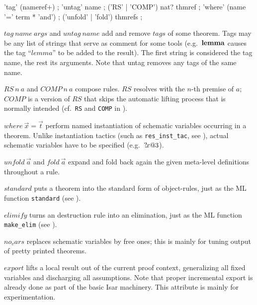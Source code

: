 \begin{rail}
  'tag' (nameref+)
  ;
  'untag' name
  ;
  ('RS' | 'COMP') nat? thmref
  ;
  'where' (name '=' term * 'and')
  ;
  ('unfold' | 'fold') thmrefs
  ;
\end{rail}

\begin{descr}
\item [$tag~name~args$ and $untag~name$] add and remove $tags$ of some
  theorem.  Tags may be any list of strings that serve as comment for some
  tools (e.g.\ ${\mathord{\mathbf{lemma}}}$ causes the tag ``$lemma$'' to be added to the
  result).  The first string is considered the tag name, the rest its
  arguments.  Note that untag removes any tags of the same name.
\item [$RS~n~a$ and $COMP~n~a$] compose rules.  $RS$ resolves with the $n$-th
  premise of $a$; $COMP$ is a version of $RS$ that skips the automatic lifting
  process that is normally intended (cf.\ \texttt{RS} and \texttt{COMP} in
  \cite[\S5]{isabelle-ref}).
\item [$where~\vec x = \vec t$] perform named instantiation of schematic
  variables occurring in a theorem.  Unlike instantiation tactics (such as
  \texttt{res_inst_tac}, see \cite{isabelle-ref}), actual schematic variables
  have to be specified (e.g.\ ${?\!x@3}$).
  
\item [$unfold~\vec a$ and $fold~\vec a$] expand and fold back again the given
  meta-level definitions throughout a rule.
 
\item [$standard$] puts a theorem into the standard form of object-rules, just
  as the ML function \texttt{standard} (see \cite[\S5]{isabelle-ref}).
  
\item [$elimify$] turns an destruction rule into an elimination, just as the
  ML function \texttt{make\_elim} (see \cite{isabelle-ref}).
  
\item [$no_vars$] replaces schematic variables by free ones; this is mainly
  for tuning output of pretty printed theorems.
  
\item [$export$] lifts a local result out of the current proof context,
  generalizing all fixed variables and discharging all assumptions.  Note that
  proper incremental export is already done as part of the basic Isar
  machinery.  This attribute is mainly for experimentation.
  
\end{descr}


